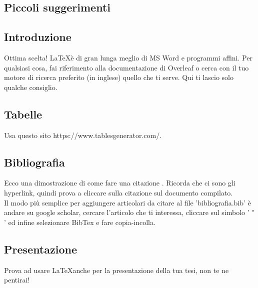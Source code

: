 \documentclass[a4paper, 13pt, oneside]{report}
\begin{document}
\dominitoc
\tableofcontents

\begin{center}
\vfill
    \chapter{Piccoli suggerimenti}
    \label{blx:refsection\therefsection}
\vfill
\minitoc
\newpage
\end{center}
\justify

\section{Introduzione}
Ottima scelta! \LaTeX è di gran lunga meglio di MS Word e programmi affini. Per qualsiasi cosa, fai riferimento alla documentazione di Overleaf o cerca con il tuo motore di ricerca preferito (in inglese) quello che ti serve. Qui ti lascio solo qualche consiglio.

\section{Tabelle}
Usa questo sito https://www.tablesgenerator.com/.

\section{Bibliografia}
Ecco una dimostrazione di come fare una citazione \cite{lysaker2010metacognition}. Ricorda che ci sono gli hyperlink, quindi prova a cliccare sulla citazione sul documento compilato. \\
Il modo più semplice per aggiungere articolari da citare al file 'bibliografia.bib' è andare su google scholar, cercare l'articolo che ti interessa, cliccare sul simbolo ' " ' ed infine selezionare BibTex e fare copia-incolla.

\section{Presentazione}
Prova ad usare \LaTeX anche per la presentazione della tua tesi, non te ne pentirai!

\medskip


\printbibheading[
heading=bibintoc,
title={Bibliografia}
]
\bibbysection[heading=bibbysubsect]
\end{document}
